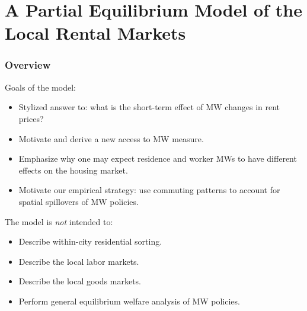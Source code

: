 \documentclass[aspectratio=169, t]{beamer}
\begin{document}
\section{A Partial Equilibrium Model of the Local Rental Markets}

\begin{frame}
    \frametitle{Overview}
    
    	Goals of the model:
	\begin{itemize}
		\item Stylized answer to: what is the short-term effect of MW changes in rent prices?
		\item Motivate and derive a new access to MW measure.
		\item Emphasize why one may expect residence and worker MWs to have different effects on the housing market.
		\item Motivate our empirical strategy: use commuting patterns to account for spatial
		spillovers of MW policies.
	\end{itemize}
	
	\pause
	\vspace{2mm}
	The model is \textit{not} intended to:
	\begin{itemize}
		\item Describe within-city residential sorting.
		\item Describe the local labor markets.
		\item Describe the local goods markets.
		\item Perform general equilibrium welfare analysis of MW policies.
	\end{itemize}
\end{frame}
\end{document}
